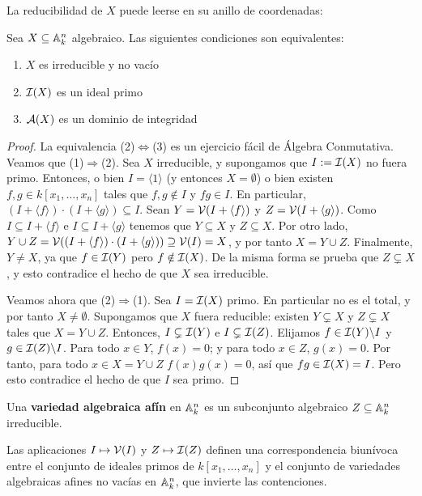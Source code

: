 \documentclass[ACGA.tex]{subfiles}
\begin{document}
La reducibilidad de $X$ puede leerse en su anillo de coordenadas:

\begin{prop}
 Sea $X\subseteq\mathbb{A}^n_k$ algebraico. Las siguientes condiciones son equivalentes:
\begin{enumerate}
 \item $X$ es irreducible y no vacío
\item $\mathcal{I}(X)$ es un ideal primo
\item ${\mathcal A}(X)$ es un dominio de integridad
\end{enumerate}

\end{prop}

\begin{proof}
 La equivalencia (2)$\Longleftrightarrow$(3) es un ejercicio fácil de Álgebra Conmutativa. Veamos que (1)$\Rightarrow$(2). Sea $X$ irreducible, y supongamos que $I:=\mathcal{I}(X)$ no fuera primo. Entonces, o bien $I=\langle 1\rangle$ (y entonces $X=\emptyset$) o bien existen $f,g\in k[x_1,\ldots,x_n]$ tales que $f,g\notin I$ y $fg\in I$. En particular, $(I+\langle f\rangle)\cdot(I+\langle g\rangle)\subseteq I$. Sean $Y=\mathcal{V}(I+\langle f\rangle)$ y $Z=\mathcal{V}(I+\langle g \rangle)$. Como $I\subseteq I+\langle f \rangle$ e $I\subseteq I+\langle g\rangle$ tenemos que $Y\subseteq X$ y $Z\subseteq X$. Por otro lado, $Y\cup Z=\mathcal{V}((I+\langle f\rangle)\cdot(I+\langle g\rangle))\supseteq\mathcal{V}(I)=X$, y por tanto $X=Y\cup Z$. Finalmente, $Y\neq X$, ya que $f\in\mathcal{I}(Y)$ pero $f\notin \mathcal{I}(X)$. De la misma forma se prueba que $Z\subsetneq X$, y esto contradice el hecho de que $X$ sea irreducible.

Veamos ahora que (2)$\Rightarrow$(1). Sea $I=\mathcal{I}(X)$ primo. En particular no es el total, y por tanto $X\neq\emptyset$. Supongamos que $X$ fuera reducible: existen $Y\subsetneq X$ y $Z\subsetneq X$ tales que $X=Y\cup Z$. Entonces, $I\subsetneq\mathcal{I}(Y)$ e $I\subsetneq\mathcal{I}(Z)$. Elijamos $f\in \mathcal{I}(Y)\backslash I$ y $g\in\mathcal{I}(Z)\backslash I$. Para todo $x\in Y$, $f(x)=0$; y para todo $x\in Z$, $g(x)=0$. Por tanto, para todo $x\in X=Y\cup Z$ $f(x)g(x)=0$, así que $fg\in\mathcal{I}(X)=I$. Pero esto contradice el hecho de que $I$ sea primo.
\end{proof}

\begin{defi}
 Una {\bf variedad algebraica afín} en $\mathbb{A}^n_k$ es un subconjunto algebraico $Z\subseteq\mathbb{A}^n_k$ irreducible.
\end{defi}

\begin{coro}
  Las aplicaciones $I\mapsto \mathcal{V}(I)$ y $Z\mapsto \mathcal{I}(Z)$ definen una correspondencia biunívoca entre el conjunto de ideales primos de $k[x_1,\ldots,x_n]$ y el conjunto de variedades algebraicas afines no vacías en $\mathbb{A}^n_k$, que invierte las contenciones. 
  
\end{coro}
\end{document}
